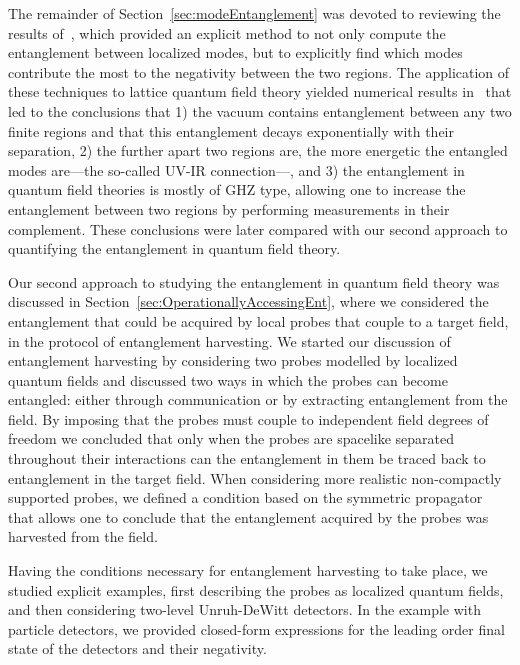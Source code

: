 \documentclass[letterpaper,12pt,titlepage,oneside,final]{book}
\begin{document}
The remainder of Section~\ref{sec:modeEntanglement} was devoted to reviewing the results of~\cite{KlcoUVIR,KlcoEntStrQFTI,KlcoEntStrQFTII,KlcoEntAllDist}, which provided an explicit method to not only compute the entanglement between localized modes, but to explicitly find which modes contribute the most to the negativity between the two regions. The application of these techniques to lattice quantum field theory yielded numerical results in~\cite{KlcoUVIR,KlcoEntStrQFTI,KlcoEntStrQFTII,KlcoEntAllDist} that led to the conclusions that 1) the vacuum contains entanglement between any two finite regions and that this entanglement decays exponentially with their separation, 2) the further apart two regions are, the more energetic the entangled modes are---the so-called UV-IR connection---, and 3) the entanglement in quantum field theories is mostly of GHZ type, allowing one to increase the entanglement between two regions by performing measurements in their complement. These conclusions were later compared with our second approach to quantifying the entanglement in quantum field theory.

Our second approach to studying the entanglement in quantum field theory was discussed in Section~\ref{sec:OperationallyAccessingEnt}, where we considered the entanglement that could be acquired by local probes that couple to a target field, in the protocol of entanglement harvesting. We started our discussion of entanglement harvesting by considering two probes modelled by localized quantum fields and discussed two ways in which the probes can become entangled: either through communication or by extracting entanglement from the field. By imposing that the probes must couple to independent field degrees of freedom we concluded that only when the probes are spacelike separated throughout their interactions can the entanglement in them be traced back to entanglement in the target field. When considering more realistic non-compactly supported probes, we defined a condition based on the symmetric propagator that allows one to conclude that the entanglement acquired by the probes was harvested from the field.

Having the conditions necessary for entanglement harvesting to take place, we studied explicit examples, first describing the probes as localized quantum fields, and then considering two-level Unruh-DeWitt detectors. In the example with particle detectors, we provided closed-form expressions for the leading order final state of the detectors and their negativity. 
\end{document}
